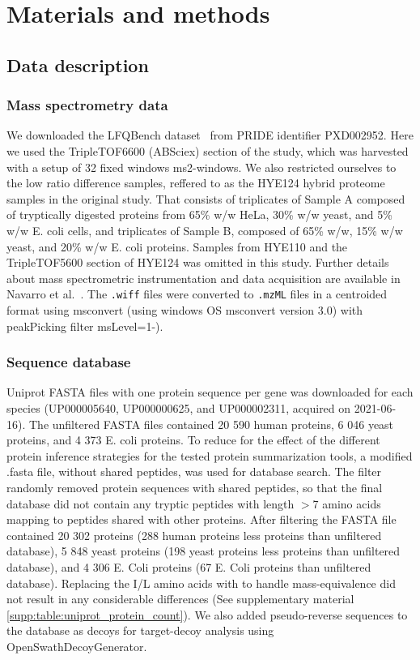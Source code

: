 \documentclass[10pt,letterpaper]{article}
\begin{document}
 
\section*{Materials and methods}


\subsection*{Data description}
\subsubsection*{Mass spectrometry data}


We downloaded the LFQBench dataset~\cite{navarro2016multicenter} from PRIDE identifier PXD002952. Here we used the TripleTOF6600 (ABSciex) section of the study, which was harvested with a setup of 32 fixed windows ms2-windows. We also restricted ourselves to the low ratio difference samples, reffered to as the HYE124 hybrid proteome samples in the original study. That consists of triplicates of Sample A composed of tryptically digested proteins from 65\% w/w HeLa, 30\% w/w yeast, and 5\% w/w E. coli cells, and triplicates of Sample B, composed of 65\% w/w, 15\% w/w yeast, and 20\% w/w E. coli proteins. Samples from HYE110 and the TripleTOF5600 section of HYE124 was omitted in this study. Further details about mass spectrometric instrumentation and data acquisition are available in Navarro et al.~\cite{navarro2016multicenter}. The \verb|.wiff| files were converted to \verb|.mzML| files in a centroided format using msconvert (using windows OS msconvert version 3.0) with peakPicking filter msLevel=1-). 


\subsubsection*{Sequence database}

Uniprot FASTA files with one protein sequence per gene was downloaded for each species (UP000005640, UP000000625, and UP000002311, acquired on 2021-06-16). The unfiltered FASTA files contained 20 590 human proteins, 6 046 yeast proteins, and 4 373 E. coli proteins. To reduce for the effect of the different protein inference strategies for the tested protein summarization tools, a modified .fasta file, without shared peptides, was used for database search. The filter randomly removed protein sequences with shared peptides, so that the final database did not contain any tryptic peptides with length $>$7 amino acids mapping to peptides shared with other proteins. After filtering the FASTA file contained 20 302 proteins (288 human proteins less proteins than unfiltered database), 5 848 yeast proteins (198 yeast proteins less proteins than unfiltered database), and 4 306 E. Coli proteins (67 E. Coli proteins than unfiltered database). Replacing the I/L amino acids with to handle mass-equivalence did not result in any considerable differences (See supplementary material \ref{supp:table:uniprot_protein_count}). We also added pseudo-reverse sequences to the database as decoys for target-decoy analysis using OpenSwathDecoyGenerator. 
\end{document}
